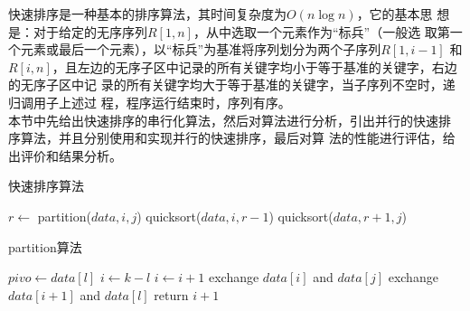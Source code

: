 \documentclass[fontsize=11pt, %
                             paper=a4, %
                             oneside, %
                             captions=tableheading,
                             index=totoc,
                             hyperref]{labbook}
\begin{document}
\begin{addmargin}[0cm]{0cm} %

\pagestyle{scrheadings} %

快速排序是一种基本的排序算法，其时间复杂度为$O(n\log{n})$，它的基本思
想是：对于给定的无序序列$R[1,n]$，从中选取一个元素作为“标兵”（一般选
取第一个元素或最后一个元素），以“标兵”为基准将序列划分为两个子序列$R[1,i-1]$
和$R[i,n]$，且左边的无序子区中记录的所有关键字均小于等于基准的关键字，右边的无序子区中记
录的所有关键字均大于等于基准的关键字，当子序列不空时，递归调用子上述过
程，程序运行结束时，序列有序。 \\
\indent 本节中先给出快速排序的串行化算法，然后对算法进行分析，引出并行的快速排
序算法，并且分别使用和实现并行的快速排序，最后对算
法的性能进行评估，给出评价和结果分析。


\begin{algorithm}
\caption{快速排序算法}\label{ser_quicksort}
\begin{algorithmic}[1]
       \State $r \gets$ partition($data, i, j$) 
   \EndIf
   \State quicksort($data, i, r-1$)
   \State quicksort($data, r+1, j$)
\EndFunction
\end{algorithmic}
\end{algorithm}

\begin{algorithm}
\caption{partition算法}\label{partition}
\begin{algorithmic}[1]
   \State $pivo \gets data[l]$
   \State $i \gets k-l$ 
           \State $i \gets i+1$
           \State exchange $data[i]$ and $data[j]$
       \EndIf
   \EndFor
   \State exchange $data[i+1]$ and $data[l]$
   \State return $i+1$
\EndFunction
\end{algorithmic}
\end{algorithm}


\end{addmargin}
\end{document}
